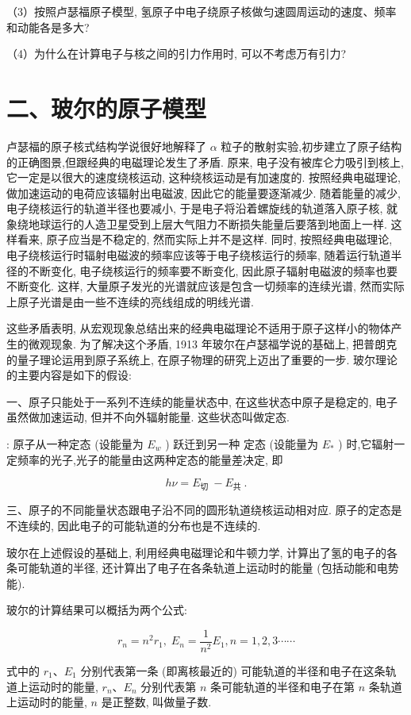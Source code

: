 \documentclass[10pt]{article}
\begin{document}
（3）按照卢瑟福原子模型, 氢原子中电子绕原子核做匀速圆周运动的速度、频率和动能各是多大?

（4）为什么在计算电子与核之间的引力作用时, 可以不考虑万有引力?

\section*{二、玻尔的原子模型}

卢瑟福的原子核式结构学说很好地解释了 \(\alpha\) 粒子的散射实验,初步建立了原子结构的正确图景,但跟经典的电磁理论发生了矛盾. 原来, 电子没有被库仑力吸引到核上, 它一定是以很大的速度绕核运动, 这种绕核运动是有加速度的. 按照经典电磁理论, 做加速运动的电荷应该辐射出电磁波, 因此它的能量要逐渐减少. 随着能量的减少, 电子绕核运行的轨道半径也要减小, 于是电子将沿着螺旋线的轨道落入原子核, 就象绕地球运行的人造卫星受到上层大气阻力不断损失能量后要落到地面上一样. 这样看来, 原子应当是不稳定的, 然而实际上并不是这样. 同时, 按照经典电磁理论, 电子绕核运行时辐射电磁波的频率应该等于电子绕核运行的频率, 随着运行轨道半径的不断变化, 电子绕核运行的频率要不断变化, 因此原子辐射电磁波的频率也要不断变化. 这样, 大量原子发光的光谱就应该是包含一切频率的连续光谱, 然而实际上原子光谱是由一些不连续的亮线组成的明线光谱.

这些矛盾表明, 从宏观现象总结出来的经典电磁理论不适用于原子这样小的物体产生的微观现象. 为了解决这个矛盾, 1913 年玻尔在卢瑟福学说的基础上, 把普朗克的量子理论运用到原子系统上, 在原子物理的研究上迈出了重要的一步. 玻尔理论的主要内容是如下的假设:

一、原子只能处于一系列不连续的能量状态中, 在这些状态中原子是稳定的, 电子虽然做加速运动, 但并不向外辐射能量. 这些状态叫做定态.

: 原子从一种定态 (设能量为 \({E}_{w}\) ) 跃迁到另一种 定态 (设能量为 \({E}_{ * }\) ) 时,它辐射一定频率的光子,光子的能量由这两种定态的能量差决定, 即

\[
{h\nu } = {E}_{\text{切 }} - {E}_{\text{共 }}.
\]

三、原子的不同能量状态跟电子沿不同的圆形轨道绕核运动相对应. 原子的定态是不连续的, 因此电子的可能轨道的分布也是不连续的.

玻尔在上述假设的基础上, 利用经典电磁理论和牛顿力学, 计算出了氢的电子的各条可能轨道的半径, 还计算出了电子在各条轨道上运动时的能量 (包括动能和电势能).

玻尔的计算结果可以概括为两个公式:

\[
{r}_{n} = {n}^{2}{r}_{1},\;{E}_{n} = \frac{1}{{n}^{2}}{E}_{1},n = 1,2,3\cdots \cdots
\]

式中的 \({r}_{1}\text{、}{E}_{1}\) 分别代表第一条 (即离核最近的) 可能轨道的半径和电子在这条轨道上运动时的能量, \({r}_{n}\text{、}{E}_{n}\) 分别代表第 \(n\) 条可能轨道的半径和电子在第 \(n\) 条轨道上运动时的能量, \(n\) 是正整数, 叫做量子数.
\end{document}
